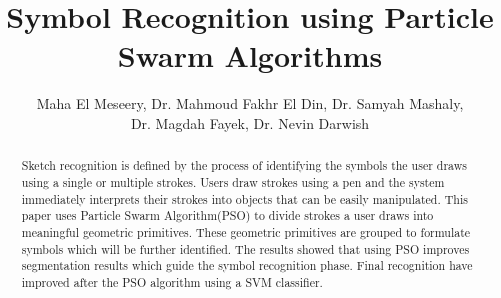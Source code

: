 \documentclass[a4paper,10pt]{IEEEconf}
\title{ Symbol Recognition using Particle Swarm Algorithms}
\author{Maha El Meseery, Dr. Mahmoud Fakhr El Din, Dr. Samyah Mashaly,
\\ Dr. Magdah Fayek, Dr. Nevin Darwish}
\begin{document}
\maketitle
\begin{abstract}
Sketch recognition is defined by the process of identifying the symbols the user draws using a single or multiple strokes. Users draw strokes using a pen and the system immediately interprets their strokes into objects that can be easily manipulated. This paper uses Particle Swarm Algorithm(PSO) to divide strokes a user draws into meaningful geometric primitives. These geometric primitives are grouped to formulate symbols which will be further identified. The results showed that using PSO improves segmentation results which guide the symbol recognition phase. Final recognition have improved after the PSO algorithm using a SVM classifier.  
\end{abstract}
\end{document}
